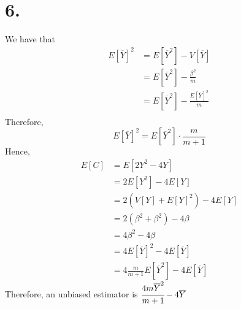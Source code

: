 \documentclass[11pt]{article}
\begin{document}
\section*{6.}
We have that 
\begin{equation*}
    \begin{aligned}
        E[\overline{Y}]^2 
        & = E[\overline{Y}^2] - V[\overline{Y}] \\
        & = E[\overline{Y}^2] -  \frac{\beta^2}{m} \\
        & = E[\overline{Y}^2] -  \frac{E[\overline{Y}]^2}{m} \\
    \end{aligned}
\end{equation*}
Therefore, 
\[
    E[\overline{Y}]^2 = E[\overline{Y}^2] \cdot \frac{m}{m+1}   
\]
Hence, 
\begin{equation*}
    \begin{aligned}
        E[C] &= E[2Y^2 - 4Y] \\
        & = 2E[Y^2] - 4E[Y] \\
        & = 2(V[Y] +E[Y]^2) - 4E[Y] \\
        & = 2(\beta^2 + \beta^2) - 4 \beta \\
        & = 4\beta^2 - 4\beta \\
        & = 4E[\overline{Y}]^2 - 4 E[\overline{Y}] \\
        & = 4 \frac{m}{m+1} E[\overline{Y}^2] - 4E[\overline{Y}]
    \end{aligned}
\end{equation*}
Therefore, an unbiased estimator is $\cfrac{4m \overline{Y}^2}{m+1} - 4\overline{Y}$
\pagebreak
\end{document}
